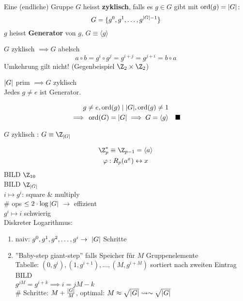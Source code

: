 \begin{def*}[note = zyklisch , index = zyklisch]
	Eine (endliche) Gruppe $G$ heisst \textbf{zyklisch}, falls es $g \in G$ gibt mit $\operatorname{ord}(g) = \abs{G}$:
	\[ G = \{ g^0 , g^1 , \dotsc , g^{\abs{G}-1} \} \]
	$g$ heisst \textbf{Generator} von $g$, $G \equiv \langle g \rangle$
\end{def*}
\begin{bem}
	$G$ zyklisch $\implies G$ abelsch \\
	\[ a \circ b = g^i \circ g^j = g^{i+j} = g^{j+i} = b \circ a \]
	Umkehrung gilt nicht! (Gegenbeispiel $\Z_2 \times \Z_2$)
\end{bem}
\begin{satz*}
	$\abs{G}$ prim $\implies G$ zyklisch \\
	Jedes $g \neq e$ ist Generator. \\
	\begin{bew}
		\begin{gather*}
			g \neq e , \ord(g) \mid \abs{G} , \ord(g) \neq 1 \\
			\implies \ord(G) = \abs{G} \implies G = \langle g \rangle \quad \blacksquare
		\end{gather*}
	\end{bew}
\end{satz*}
$G$ zyklisch : $G \equiv \Z_{\abs{G}}$ \\
\begin{bsp*}
	\begin{gather*}
		\Z_p^* \equiv \Z_{p-1} = \langle a \rangle \\
		\varphi : R_p(a^x) \leftrightarrow x
	\end{gather*}
	BILD $\Z_{10}$ \\
	BILD $\Z_{\abs{G}}$ \\
	$i \mapsto g^i$: square \& multiply \\
	\# ops $\leq 2 \cdot \log \abs{G}$
	$\rightarrow$ effizient \\
	$g^i \mapsto i$ schwierig \\
	Diskreter Logarithmus:
	\begin{enumerate}[label=\arabic*)]
		\item naiv: $g^0 , g^1 , g^2 , \dotsc , g^i \rightarrow \abs{G}$ Schritte
		\item ''Baby-step giant-step'' falls Speicher für $M$ Gruppenelemente \\
			Tabelle: $(0,g^i) , (1,g^{i+1}) , \dotsc , (M,g^{i+M})$ sortiert nach zweiten Eintrag \\
			BILD \\
			$g^{jM} = g^{i+k} \implies i = jM - k$ \\
			\# Schritte: $M + \frac{\abs{G}}{M}$, optimal: $M \approx \sqrt{\abs{G}} \rightsquigarrow \sim \sqrt{\abs{G}}$
	\end{enumerate}
\end{bsp*}
